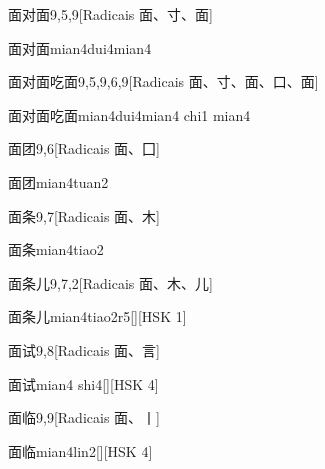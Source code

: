 \begin{entry}{面对面}{9,5,9}[Radicais ⾯、⼨、⾯]
  \begin{phonetics}{面对面}{mian4dui4mian4}
  \end{phonetics}
\end{entry}

\begin{entry}{面对面吃面}{9,5,9,6,9}[Radicais ⾯、⼨、⾯、⼝、⾯]
  \begin{phonetics}{面对面吃面}{mian4dui4mian4 chi1 mian4}
  \end{phonetics}
\end{entry}

\begin{entry}{面团}{9,6}[Radicais ⾯、⼞]
  \begin{phonetics}{面团}{mian4tuan2}
  \end{phonetics}
\end{entry}

\begin{entry}{面条}{9,7}[Radicais ⾯、⽊]
  \begin{phonetics}{面条}{mian4tiao2}
  \end{phonetics}
\end{entry}

\begin{entry}{面条儿}{9,7,2}[Radicais ⾯、⽊、⼉]
  \begin{phonetics}{面条儿}{mian4tiao2r5}[][HSK 1]
  \end{phonetics}
\end{entry}

\begin{entry}{面试}{9,8}[Radicais ⾯、⾔]
  \begin{phonetics}{面试}{mian4 shi4}[][HSK 4]
  \end{phonetics}
\end{entry}

\begin{entry}{面临}{9,9}[Radicais ⾯、⼁]
  \begin{phonetics}{面临}{mian4lin2}[][HSK 4]
  \end{phonetics}
\end{entry}


